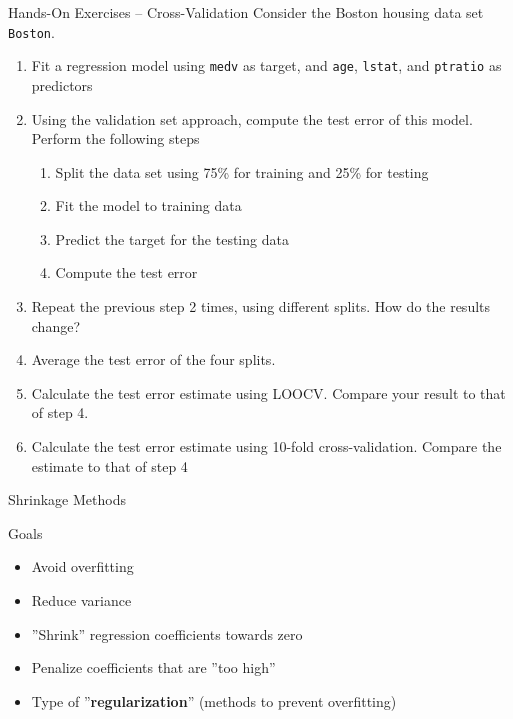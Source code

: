 \documentclass[ignorenonframetext,xcolor=x11names]{beamer}
\begin{document}




\begin{frame}{Hands-On Exercises -- Cross-Validation}
Consider the Boston housing data set \texttt{Boston}.
\begin{enumerate}
  \item Fit a regression model using \texttt{medv} as target, and \texttt{age}, \texttt{lstat}, and \texttt{ptratio} as predictors
  \item Using the validation set approach, compute the test error of this model. Perform the following steps
  \begin{enumerate}
     \item Split the data set using 75\% for training and 25\% for testing
     \item Fit the model to training data
     \item Predict the target for the testing data
     \item Compute the test error
  \end{enumerate}
  \item Repeat the previous step 2 times, using different splits. How do the results change?
  \item Average the test error of the four splits. 
  \item Calculate the test error estimate using LOOCV. Compare your result to that of step 4.
  \item Calculate the test error estimate using 10-fold cross-validation. Compare the estimate to that of step 4
\end{enumerate}
\end{frame}

\begin{frame}{Shrinkage Methods}
\begin{block}{Goals}
\begin{itemize}
   \item Avoid overfitting
   \item Reduce variance
   \item ''Shrink'' regression coefficients towards zero
   \item Penalize coefficients that are ''too high''
   \item Type of ''\textbf{regularization}'' (methods to prevent overfitting)
\end{itemize}
\end{block}
\end{frame}
\end{document}
